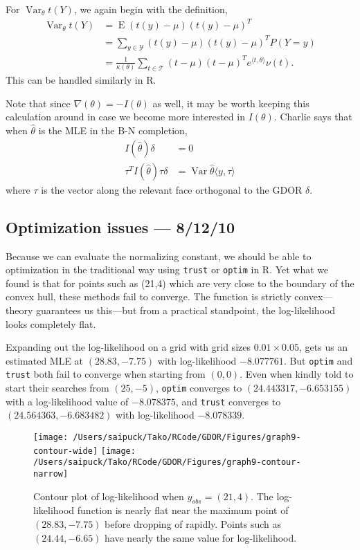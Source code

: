 \documentclass{amsbook}
\DeclareMathOperator{\E}{E}
\DeclareMathOperator{\Var}{Var}
\def\YY{{\mathcal Y}}
\def\TT{{\mathcal T}}
\newcommand{\inner}[1]{\langle #1 \rangle}
\theoremstyle{definition}
\theoremstyle{remark}
\begin{document}
For $\Var_\theta t(Y)$, we again begin with the definition, 
\begin{align*}
\Var_\theta t(Y) &= \E (t(y) - \mu)( t(y) - \mu)^T \\
				&= \sum_{y \in \YY} (t(y) - \mu)( t(y) - \mu)^T P(Y=y)\\
				&= \frac{1}{\kappa(\theta)} \sum_{t\in \TT}
					(t - \mu)( t - \mu)^T e^{\inner{t,\theta}} \nu(t).
\end{align*}
This can be handled similarly in R.

Note that since $\nabla(\theta) = - I(\theta)$ as well, it may be worth keeping this calculation around in case we become more interested in $I(\theta)$.
Charlie says that when $\hat{\theta}$ is the MLE in the B-N completion,
\begin{align*}
	I(\hat{\theta}) \delta &= 0 \\
	\tau^T I(\hat{\theta}) \tau \delta &= \Var{\hat{\theta}}\inner{y, \tau}
\end{align*}
where $\tau$ is the vector along the relevant face orthogonal to the GDOR $\delta$.

\subsection{Optimization issues --- 8/12/10}
Because we can evaluate the normalizing constant, we should be able to optimization in the traditional way using \texttt{trust} or \texttt{optim} in R.  Yet what we found is that for points such as (21,4) which are very close to the boundary of the convex hull, these methods fail to converge.  The function is strictly convex---theory guarantees us this---but from a practical standpoint, the log-likelihood looks completely flat.  

Expanding out the log-likelihood on a grid with grid sizes $0.01 \times 0.05$, gets us an estimated MLE at $(28.83, -7.75)$ with log-likelihood $-8.077761$.  But \texttt{optim} and \texttt{trust} both fail to converge when starting from $(0,0)$.   Even when kindly told to start their searches from $(25, -5)$, \texttt{optim} converges to $(24.443317, -6.653155)$ with a log-likelihood value of $-8.078375$, and \texttt{trust} converges to $(24.564363, -6.683482)$ with log-likelihood $-8.078339$.  
\begin{figure}[!h]
\centering
\texttt{[image: /Users/saipuck/Tako/RCode/GDOR/Figures/graph9-contour-wide]}
\texttt{[image: /Users/saipuck/Tako/RCode/GDOR/Figures/graph9-contour-narrow]}
\caption{Contour plot of log-likelihood when $y_{obs} = (21,4)$.  The log-likelihood function is nearly flat near the maximum point of $(28.83, -7.75)$ before dropping of rapidly.  Points such as $(24.44, -6.65)$ have nearly the same value for log-likelihood. }
\end{figure}
\end{document}
